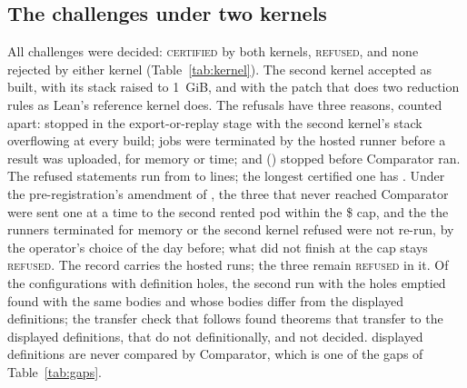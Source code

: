 \documentclass[preprint,11pt,authoryear,a4paper]{elsarticle}
\newcommand{\vword}[1]{{\normalfont\scshape #1}}
\newcommand{\vC}{\vword{certified}}
\newcommand{\vF}{\vword{refused}}
\begin{document}
\subsection{The challenges under two kernels}\label{sec:kernel}
All \MtOaChallenges{} challenges were decided: \MtOaCertified{} \vC{} by both kernels, \MtOaRefused{} \vF, and none rejected by either kernel (Table~\ref{tab:kernel}). The second kernel accepted \MtOaNanodaStock{} as built, \MtOaNanodaStack{} with its stack raised to 1~GiB, and \MtOaNanodaPatched{} with the patch that does two reduction rules as Lean's reference kernel does. The \OmRefused{} refusals have three reasons, counted apart: \OmRefusedStack{} stopped in the export-or-replay stage with the second kernel's stack overflowing at every build; \OmRefusedTerminated{} jobs were terminated by the hosted runner before a result was uploaded, for memory or time; and \OmRefusedBefore{} (\OmRefusedBeforeNames) stopped before Comparator ran. The refused statements run from \OmRefusedLinesMin{} to \OmRefusedLinesMax{} lines; the longest certified one has \OmCertifiedLinesMax. Under the pre-registration's amendment of \OmPodTwoDate, the three that never reached Comparator were sent one at a time to the second rented pod within the \$\OmPodTwoCap{} cap, and the \OmNotRerun{} the runners terminated for memory or the second kernel refused were not re-run, by the operator's choice of the day before; what did not finish at the cap stays \vF. The record carries the hosted runs; the three remain \vF{} in it. Of the \OmDefHoleConfigs{} configurations with definition holes, the second run with the holes emptied found \OmStrictSame{} with the same bodies and \OmStrictDiffer{} whose bodies differ from the displayed definitions; the transfer check that follows found \OmTransferYes{} theorems that transfer to the displayed definitions, \OmTransferNotDefinitional{} that do not definitionally, and \OmTransferNotDecided{} not decided. \MtOaHolesDisplayed{} displayed definitions are never compared by Comparator, which is one of the gaps of Table~\ref{tab:gaps}.
\end{document}
